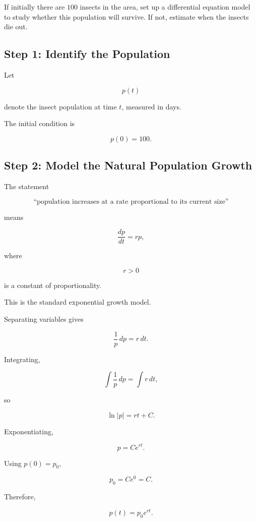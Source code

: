 \documentclass[11pt]{article}
\begin{document}
If initially there are \(100\) insects in the area, set up a
differential equation model to study whether this population will
survive. If not, estimate when the insects die out.

\subsection{Step 1: Identify the Population}

Let

\[
p(t)
\]

denote the insect population at time \(t\), measured in days.

The initial condition is

\[
\boxed{p(0)=100.}
\]

\subsection{Step 2: Model the Natural Population Growth}

The statement

\[
\text{``population increases at a rate proportional to its current size''}
\]

means

\[
\frac{dp}{dt}=rp,
\]

where

\[
r>0
\]

is a constant of proportionality.

This is the standard exponential growth model.

Separating variables gives

\[
\frac{1}{p}\,dp=r\,dt.
\]

Integrating,

\[
\int \frac{1}{p}\,dp
=
\int r\,dt,
\]

so

\[
\ln|p|=rt+C.
\]

Exponentiating,

\[
p=Ce^{rt}.
\]

Using \(p(0)=p_0\),

\[
p_0=Ce^0=C.
\]

Therefore,

\[
\boxed{
p(t)=p_0e^{rt}.
}
\]

\end{document}
